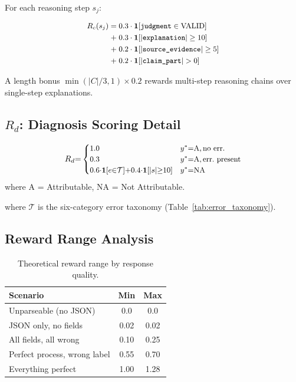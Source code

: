 \documentclass[11pt]{article}
\begin{document}
For each reasoning step $s_j$:

\begin{equation}
\small
\begin{aligned}
R_c(s_j) = & \; 0.3 \cdot \mathbf{1}[\texttt{judgment} \in \text{VALID}] \\
          + & \; 0.3 \cdot \mathbf{1}[|\texttt{explanation}| \geq 10] \\
          + & \; 0.2 \cdot \mathbf{1}[|\texttt{source\_evidence}| \geq 5] \\
          + & \; 0.2 \cdot \mathbf{1}[|\texttt{claim\_part}| > 0]
\end{aligned}
\end{equation}

A length bonus $\min(|C|/3, 1) \times 0.2$ rewards multi-step reasoning chains over single-step explanations.

\subsection{$R_d$: Diagnosis Scoring Detail}

\begin{equation}
\small
R_d {=}
\begin{cases}
1.0 & y^* {=} \text{A}, \text{no err.} \\
0.3 & y^* {=} \text{A}, \text{err.\ present} \\
0.6{\cdot}\mathbf{1}[e {\in} \mathcal{T}] {+} 0.4{\cdot}\mathbf{1}[|s| {\geq} 10] & y^* {=} \text{NA}
\end{cases}
\end{equation}
where A = Attributable, NA = Not Attributable.

where $\mathcal{T}$ is the six-category error taxonomy (Table~\ref{tab:error_taxonomy}).

\subsection{Reward Range Analysis}

\begin{table}[h]
\centering
\small
\caption{Theoretical reward range by response quality.}
\label{tab:reward_range}
\begin{tabular}{lcc}
\toprule
\textbf{Scenario} & \textbf{Min} & \textbf{Max} \\
\midrule
Unparseable (no JSON) & 0.0 & 0.0 \\
JSON only, no fields & 0.02 & 0.02 \\
All fields, all wrong & 0.10 & 0.25 \\
Perfect process, wrong label & 0.55 & 0.70 \\
Everything perfect & 1.00 & 1.28 \\
\bottomrule
\end{tabular}
\end{table}
\end{document}
